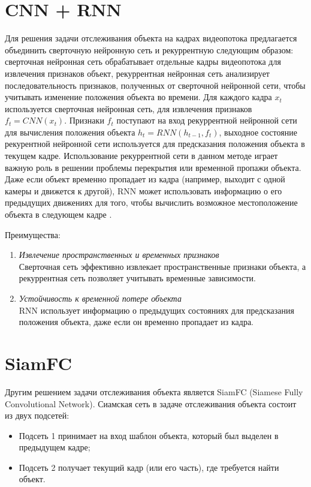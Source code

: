 
\section{CNN + RNN}
Для решения задачи отслеживания объекта на кадрах видеопотока предлагается объединить сверточную нейронную сеть и рекуррентную следующим образом: сверточная нейронная сеть обрабатывает отдельные кадры видеопотока для извлечения признаков объект, рекуррентная нейронная сеть анализирует последовательность признаков, полученных от сверточной нейронной сети, чтобы учитывать изменение положения объекта во времени. Для каждого кадра $x_t$ используется сверточная нейронная сеть, для извлечения признаков $f_t = CNN(x_t)$. Признаки $f_t$ поступают на вход рекуррентной нейронной сети для вычисления положения объекта $h_t = RNN(h_{t-1}, f_t)$, выходное состояние рекурентной нейронной сети используется для предсказания положения объекта в текущем кадре. Использование рекуррентной сети в данном методе играет важную роль в решении проблемы перекрытия или временной пропажи объекта.  Даже если объект временно пропадает из кадра (например, выходит с одной камеры и движется к другой), RNN может использовать информацию о его предыдущих движениях для того, чтобы вычислить возможное местоположение объекта в следующем кадре \cite{Girshick2014}.

Преимущества:
\begin{enumerate}
\item \textit{Извлечение пространственных и временных признаков} \\
Сверточная сеть эффективно извлекает пространственные признаки объекта, а рекуррентная сеть позволяет учитывать временные зависимости.

\item \textit{Устойчивость к временной потере объекта} \\
RNN использует информацию о предыдущих состояниях для предсказания положения объекта, даже если он временно пропадает из кадра.
\end{enumerate}

\section{SiamFC}
Другим решением задачи отслеживания объекта является SiamFC (Siamese Fully Convolutional Network). Сиамская сеть в задаче отслеживания объекта состоит из двух подсетей: 
\begin{itemize}
\item Подсеть 1 принимает на вход шаблон объекта, который был выделен в предыдущем кадре;
\item Подсеть 2 получает текущий кадр (или его часть), где требуется найти объект.
\end{itemize}

